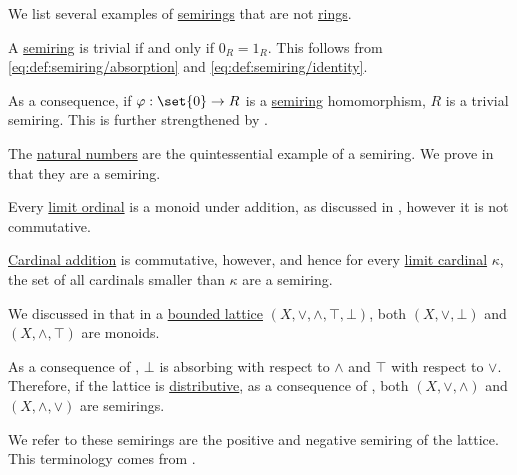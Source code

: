 \begin{example}\label{ex:def:semiring}
  We list several examples of \hyperref[def:semiring]{semirings} that are not \hyperref[def:ring]{rings}.

  \begin{thmenum}
     A \hyperref[def:semiring/homomorphism]{semiring} is trivial if and only if \( 0_R = 1_R \). This follows from \eqref{eq:def:semiring/absorption} and \eqref{eq:def:semiring/identity}.

    As a consequence, if \( \varphi: \set{ 0 } \to R \) is a \hyperref[def:semiring/homomorphism]{semiring} homomorphism, \( R \) is a trivial semiring. This is further strengthened by .

     The \hyperref[def:set_of_natural_numbers]{natural numbers} are the quintessential example of a semiring. We prove in  that they are a semiring.

     Every \hyperref[def:successor_and_limit_ordinal]{limit ordinal} is a monoid under addition, as discussed in , however it is not commutative.

    \hyperref[def:cardinal_arithmetic/addition]{Cardinal addition} is commutative, however, and hence for every \hyperref[def:successor_and_limit_cardinal/weak_limit]{limit cardinal} \( \kappa \), the set of all cardinals smaller than \( \kappa \) are a semiring.

     We discussed in  that in a \hyperref[def:semilattice/bounded]{bounded lattice} \( (X, \vee, \wedge, \top, \bot) \), both \( (X, \vee, \bot) \) and \( (X, \wedge, \top) \) are monoids.

    As a consequence of , \( \bot \) is absorbing with respect to \( \wedge \) and \( \top \) with respect to \( \vee \). Therefore, if the lattice is \hyperref[def:semilattice/distributive_lattice]{distributive}, as a consequence of , both \( (X, \vee, \wedge) \) and \( (X, \wedge, \vee) \) are semirings.

    We refer to these semirings are the positive and negative semiring of the lattice. This terminology comes from .
  \end{thmenum}
\end{example}

